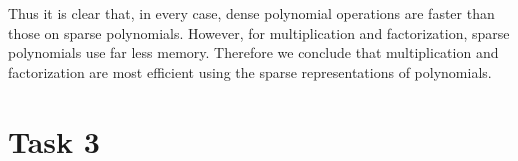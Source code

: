 \documentclass{article}
\theoremstyle{plain}
\numberwithin{theorem}{section}
\numberwithin{example}{section}
\theoremstyle{definition}
\numberwithin{definition}{section}
\begin{document}
Thus it is clear that, in every case, dense polynomial operations are faster
than those on sparse polynomials. However, for multiplication and factorization,
sparse polynomials use far less memory. Therefore we conclude that
multiplication and factorization are most efficient using the sparse
representations of polynomials.

\bigbreak

\section{Task 3}
\end{document}
